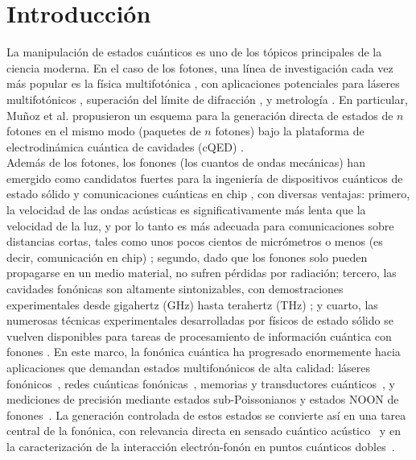 \chapter{Introducción}

La manipulación de estados cuánticos es uno de los tópicos principales de la ciencia moderna. En el caso de los fotones, una línea de investigación cada vez más popular es la física multifotónica \cite{kubanek2008,ota2011,gonzaleztudela2013,munoz2014,chang2016,kockum2017}, con aplicaciones potenciales para láseres multifotónicos \cite{gauthier1992}, superación del límite de difracción \cite{dangelo2001}, y metrología \cite{afek2010}. En particular, Muñoz et al. propusieron un esquema para la generación directa de estados de $n$ fotones en el mismo modo (paquetes de $n$ fotones) bajo la plataforma de electrodinámica cuántica de cavidades (cQED) \cite{munoz2014}.\\

Además de los fotones, los fonones (los cuantos de ondas mecánicas) han emergido como candidatos fuertes para la ingeniería de dispositivos cuánticos de estado sólido y comunicaciones cuánticas en chip \cite{balandin2005,manenti2017,noguchi2017,schuetz2015,arrangoiz2018,zhang2018}, con diversas ventajas: primero, la velocidad de las ondas acústicas es significativamente más lenta que la velocidad de la luz, y por lo tanto es más adecuada para comunicaciones sobre distancias cortas, tales como unos pocos cientos de micrómetros o menos (es decir, comunicación en chip) \cite{gustafsson2014,kuzyk2018}; segundo, dado que los fonones solo pueden propagarse en un medio material, no sufren pérdidas por radiación; tercero, las cavidades fonónicas son altamente sintonizables, con demostraciones experimentales desde gigahertz (GHz) hasta terahertz (THz) \cite{weig2004,rozas2009,soykal2011,fainstein2013,xu2018,kharel2018,oconnell2010,macCabe2020,bolgar2018,wigger2021,kettler2021,chu2017,pirkkalainen2013,gokhale2020,zalalutdinov2021}; y cuarto, las numerosas técnicas experimentales desarrolladas por físicos de estado sólido \cite{ask2019,kharel2018,xu2018,akimov2017} se vuelven disponibles para tareas de procesamiento de información cuántica con fonones \cite{manenti2017,wan2021}. En este marco, la fonónica cuántica ha progresado enormemente hacia aplicaciones que demandan estados multifonónicos de alta calidad: láseres fonónicos~\cite{kabuss2012,maryam2013,han2015,droenner2017}, redes cuánticas fonónicas~\cite{lemonde2018,calajo2019}, memorias y transductores cuánticos~\cite{schuetz2015,noguchi2017,arrangoiz2018}, y mediciones de precisión mediante estados sub-Poissonianos y estados NOON de fonones~\cite{toyoda2015,zhang2018}. La generación controlada de estos estados se convierte así en una tarea central de la fonónica, con relevancia directa en sensado cuántico acústico~\cite{zhang2018,chu2018,satzinger2018} y en la caracterización de la interacción electrón-fonón en puntos cuánticos dobles~\cite{hartke2018,gullans2018}. \\

